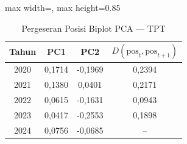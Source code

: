 \begin{table}[H]
\centering
\caption{Pergeseran Posisi Biplot PCA --- TPT} \label{tab:appjarak_pca_loading_tpt}
\begin{adjustbox}{max width=\textwidth, max height=0.85\textheight}
\begin{tabular}{|c|c|c|c|}
\hline
\textbf{Tahun} & \textbf{PC1} & \textbf{PC2} & \textbf{$D(\text{pos}_t, \text{pos}_{t+1})$} \\
\hline
2020 & 0,1714 & -0,1969 & 0,2394 \\
2021 & 0,1380 & 0,0401 & 0,2171 \\
2022 & 0,0615 & -0,1631 & 0,0943 \\
2023 & 0,0417 & -0,2553 & 0,1898 \\
2024 & 0,0756 & -0,0685 & -- \\
\hline
\end{tabular}
\end{adjustbox}
\end{table}